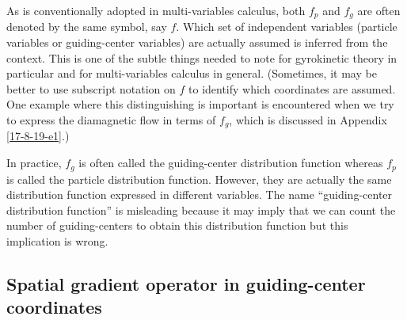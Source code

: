 \documentclass{article}
\begin{document}
As is conventionally adopted in multi-variables calculus, both $f_p$ and $f_g$
are often denoted by the same symbol, say $f$. Which set of independent
variables (particle variables or guiding-center variables) are actually
assumed is inferred from the context. This is one of the subtle things needed
to note for gyrokinetic theory in particular and for multi-variables calculus
in general. (Sometimes, it may be better to use subscript notation on $f$ to
identify which coordinates are assumed. One example where this distinguishing
is important is encountered when we try to express the diamagnetic flow in
terms of $f_g$, which is discussed in Appendix \ref{17-8-19-e1}.)

In practice, $f_g$ is often called the guiding-center distribution function
whereas $f_p$ is called the particle distribution function. However, they are
actually the same distribution function expressed in different variables. The
name ``guiding-center distribution function'' is misleading because it may
imply that we can count the number of guiding-centers to obtain this
distribution function but this implication is wrong.

\subsection{Spatial gradient operator in guiding-center coordinates}
\end{document}
